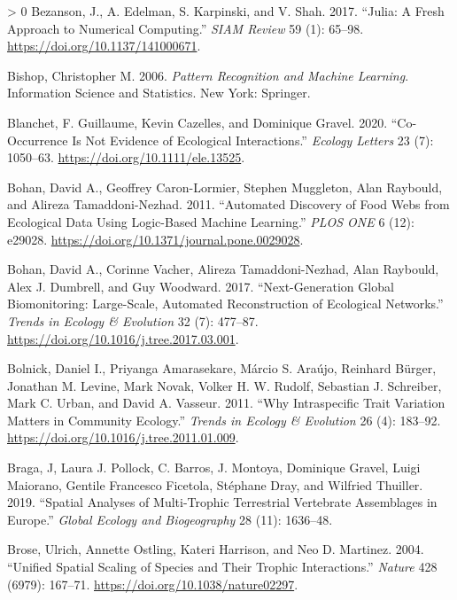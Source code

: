 \documentclass[10pt,oneside]{article}
\newlength{\cslhangindent}
\newenvironment{CSLReferences}[3] %
 {%
  \setlength{\parindent}{0pt}
  \ifodd #1 \everypar{\setlength{\hangindent}{\cslhangindent}}\ignorespaces\fi
  \ifnum #2 > 0
  \setlength{\parskip}{#2\baselineskip}
  \fi
 }%
 {}
\begin{document}
\begin{CSLReferences}{1}{0}
\leavevmode\hypertarget{ref-Bezanson2017JulFre}{}%
Bezanson, J., A. Edelman, S. Karpinski, and V. Shah. 2017. {``Julia: A
Fresh Approach to Numerical Computing.''} \emph{SIAM Review} 59 (1):
65--98. \url{https://doi.org/10.1137/141000671}.

\leavevmode\hypertarget{ref-Bishop2006PatRec}{}%
Bishop, Christopher M. 2006. \emph{Pattern Recognition and Machine
Learning}. Information Science and Statistics. New York: Springer.

\leavevmode\hypertarget{ref-Blanchet2020CooNot}{}%
Blanchet, F. Guillaume, Kevin Cazelles, and Dominique Gravel. 2020.
{``Co-Occurrence Is Not Evidence of Ecological Interactions.''}
\emph{Ecology Letters} 23 (7): 1050--63.
\url{https://doi.org/10.1111/ele.13525}.

\leavevmode\hypertarget{ref-Bohan2011AutDis}{}%
Bohan, David A., Geoffrey Caron-Lormier, Stephen Muggleton, Alan
Raybould, and Alireza Tamaddoni-Nezhad. 2011. {``Automated Discovery of
Food Webs from Ecological Data Using Logic-Based Machine Learning.''}
\emph{PLOS ONE} 6 (12): e29028.
\url{https://doi.org/10.1371/journal.pone.0029028}.

\leavevmode\hypertarget{ref-Bohan2017NexGlo}{}%
Bohan, David A., Corinne Vacher, Alireza Tamaddoni-Nezhad, Alan
Raybould, Alex J. Dumbrell, and Guy Woodward. 2017. {``Next-Generation
Global Biomonitoring: Large-Scale, Automated Reconstruction of
Ecological Networks.''} \emph{Trends in Ecology \& Evolution} 32 (7):
477--87. \url{https://doi.org/10.1016/j.tree.2017.03.001}.

\leavevmode\hypertarget{ref-Bolnick2011WhyInt}{}%
Bolnick, Daniel I., Priyanga Amarasekare, Márcio S. Araújo, Reinhard
Bürger, Jonathan M. Levine, Mark Novak, Volker H. W. Rudolf, Sebastian
J. Schreiber, Mark C. Urban, and David A. Vasseur. 2011. {``Why
Intraspecific Trait Variation Matters in Community Ecology.''}
\emph{Trends in Ecology \& Evolution} 26 (4): 183--92.
\url{https://doi.org/10.1016/j.tree.2011.01.009}.

\leavevmode\hypertarget{ref-Braga2019SpaAna}{}%
Braga, J, Laura J. Pollock, C. Barros, J. Montoya, Dominique Gravel,
Luigi Maiorano, Gentile Francesco Ficetola, Stéphane Dray, and Wilfried
Thuiller. 2019. {``Spatial Analyses of Multi-Trophic Terrestrial
Vertebrate Assemblages in Europe.''} \emph{Global Ecology and
Biogeography} 28 (11): 1636--48.

\leavevmode\hypertarget{ref-Brose2004UniSpa}{}%
Brose, Ulrich, Annette Ostling, Kateri Harrison, and Neo D. Martinez.
2004. {``Unified Spatial Scaling of Species and Their Trophic
Interactions.''} \emph{Nature} 428 (6979): 167--71.
\url{https://doi.org/10.1038/nature02297}.


\end{CSLReferences}
\end{document}
